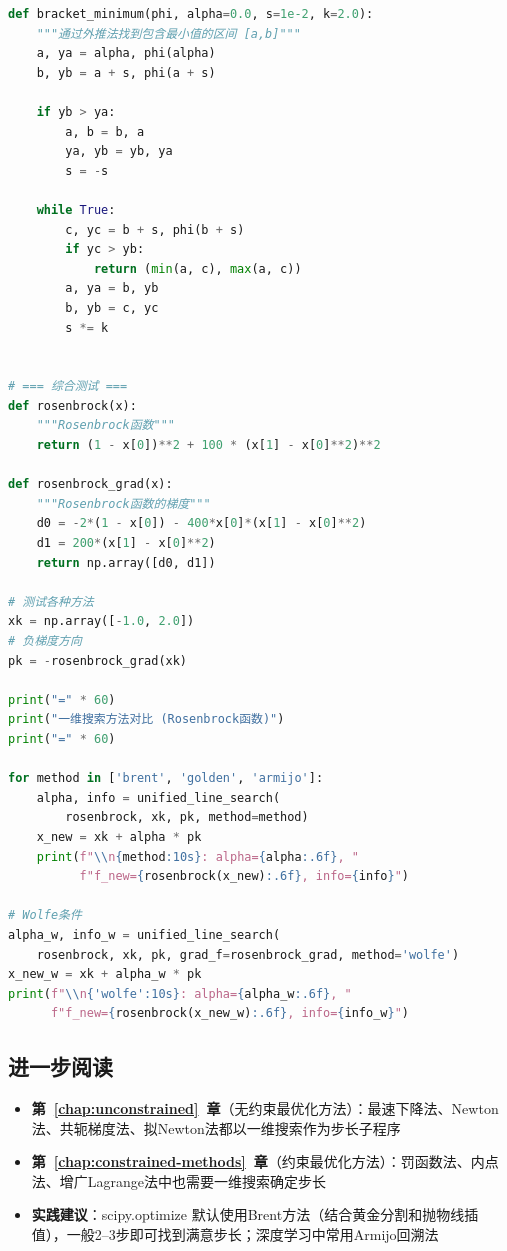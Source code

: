 \begin{lstlisting}[language=Python, caption=统一一维搜索接口]
def bracket_minimum(phi, alpha=0.0, s=1e-2, k=2.0):
    """通过外推法找到包含最小值的区间 [a,b]"""
    a, ya = alpha, phi(alpha)
    b, yb = a + s, phi(a + s)
    
    if yb > ya:
        a, b = b, a
        ya, yb = yb, ya
        s = -s
    
    while True:
        c, yc = b + s, phi(b + s)
        if yc > yb:
            return (min(a, c), max(a, c))
        a, ya = b, yb
        b, yb = c, yc
        s *= k


# === 综合测试 ===
def rosenbrock(x):
    """Rosenbrock函数"""
    return (1 - x[0])**2 + 100 * (x[1] - x[0]**2)**2

def rosenbrock_grad(x):
    """Rosenbrock函数的梯度"""
    d0 = -2*(1 - x[0]) - 400*x[0]*(x[1] - x[0]**2)
    d1 = 200*(x[1] - x[0]**2)
    return np.array([d0, d1])

# 测试各种方法
xk = np.array([-1.0, 2.0])
# 负梯度方向
pk = -rosenbrock_grad(xk)

print("=" * 60)
print("一维搜索方法对比 (Rosenbrock函数)")
print("=" * 60)

for method in ['brent', 'golden', 'armijo']:
    alpha, info = unified_line_search(
        rosenbrock, xk, pk, method=method)
    x_new = xk + alpha * pk
    print(f"\\n{method:10s}: alpha={alpha:.6f}, "
          f"f_new={rosenbrock(x_new):.6f}, info={info}")

# Wolfe条件
alpha_w, info_w = unified_line_search(
    rosenbrock, xk, pk, grad_f=rosenbrock_grad, method='wolfe')
x_new_w = xk + alpha_w * pk
print(f"\\n{'wolfe':10s}: alpha={alpha_w:.6f}, "
      f"f_new={rosenbrock(x_new_w):.6f}, info={info_w}")
\end{lstlisting}

\subsection{进一步阅读}

\begin{notebox}[后续章节关联]
\begin{itemize}[itemsep=0.3em]
    \item \textbf{第~\ref{chap:unconstrained}~章}（无约束最优化方法）：最速下降法、Newton法、共轭梯度法、拟Newton法都以一维搜索作为步长子程序
    \item \textbf{第~\ref{chap:constrained-methods}~章}（约束最优化方法）：罚函数法、内点法、增广Lagrange法中也需要一维搜索确定步长
    \item \textbf{实践建议}：scipy.optimize 默认使用Brent方法（结合黄金分割和抛物线插值），一般2--3步即可找到满意步长；深度学习中常用Armijo回溯法
\end{itemize}
\end{notebox}

